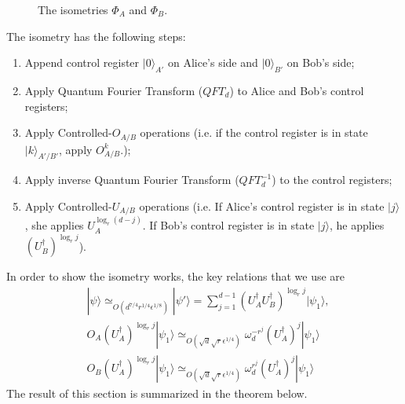\documentclass[11pt,letterpaper]{article}
\newcommand{\ket}[1]{|#1\rangle}
\newcommand{\ct}{^{\dagger}}
\newcommand{\1}{\mathbb{1}}
\newcommand{\ep}{\epsilon}
\newcommand{\qe}{\epsilon^{1/4}}
\newcommand{\sd}{\sqrt{d}}
\newcommand{\sr}{\sqrt{r}}
\newcommand{\appd}[1]{\simeq_{#1}}
\theoremstyle{definition}
\begin{document}
\begin{figure}[H]
	\caption{The isometries $\Phi_A$ and $\Phi_B$.}
\end{figure}
The isometry has the following steps:
\begin{enumerate}
	\item Append control register $\ket{0}_{A'}$ on Alice's side and $\ket{0}_{B'}$ on Bob's side;
	\item Apply Quantum Fourier Transform ($QFT_d$) to Alice and Bob's control registers;
	\item Apply Controlled-$O_{A/B}$ operations (i.e. if the control register is in state $\ket{k}_{A'/ B'}$, apply
	$O_{A/B}^k$.);
	\item Apply inverse Quantum Fourier Transform ($QFT_d^{-1}$) to the control registers;
	\item Apply Controlled-$U_{A/B}$ operations (i.e. If Alice's control register is in state $\ket{j}$, she applies
	$U_A^{\log_r (d-j)}$. If Bob's control register is in state $\ket{j}$, he applies $(U_B\ct)^{\log_r j}$).
\end{enumerate}
In order to show the isometry works, the key relations that we use are
\begin{align}
	&\ket{\psi} \appd{O(d^{7/4} r^{1/4} \ep^{1/8})}\ket{\psi'} = \sum_{j=1}^{d-1} (U_A\ct U_B\ct)^{\log_r j} \ket{\psi_1},\\
	&O_A(U_A\ct)^{\log_r j} \ket{\psi_1} \appd{O(\sd \sr \qe)}\omega_d^{-r^j}  (U_A\ct)^j \ket{\psi_1}\\
	&O_B(U_A\ct)^{\log_r j} \ket{\psi_1} \appd{O(\sd \sr \qe)}\omega_d^{r^j}  (U_A\ct)^j \ket{\psi_1}
\end{align}
The result of this section is summarized in the theorem below.
\end{document}

